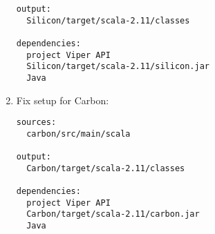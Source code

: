 \begin{enumerate}
\begin{verbatim}
output:
  Silicon/target/scala-2.11/classes

dependencies:
  project Viper API
  Silicon/target/scala-2.11/silicon.jar
  Java
\end{verbatim}
\item Fix setup for Carbon:
\begin{verbatim}
sources:
  carbon/src/main/scala

output:
  Carbon/target/scala-2.11/classes

dependencies:
  project Viper API
  Carbon/target/scala-2.11/carbon.jar
  Java
\end{verbatim}
\end{enumerate}




